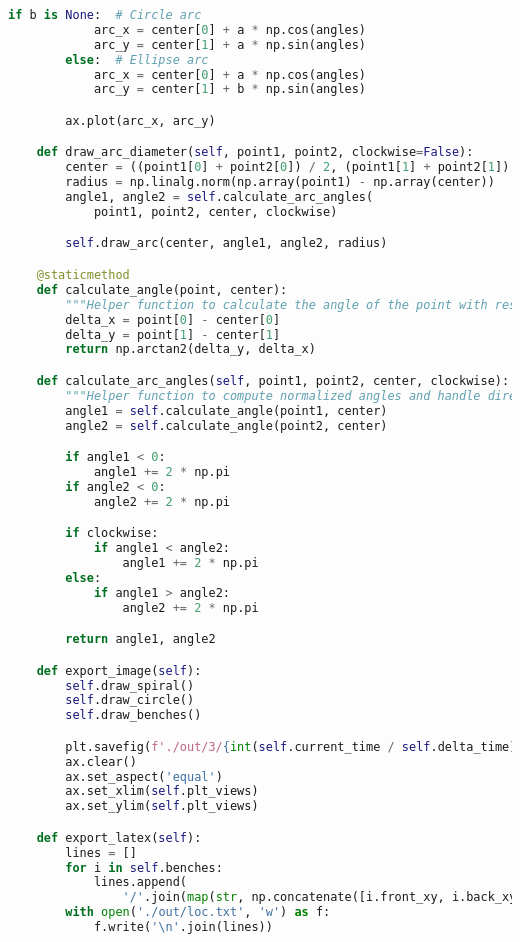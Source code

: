 \begin{lstlisting}[language=python]
        if b is None:  # Circle arc
            arc_x = center[0] + a * np.cos(angles)
            arc_y = center[1] + a * np.sin(angles)
        else:  # Ellipse arc
            arc_x = center[0] + a * np.cos(angles)
            arc_y = center[1] + b * np.sin(angles)

        ax.plot(arc_x, arc_y)

    def draw_arc_diameter(self, point1, point2, clockwise=False):
        center = ((point1[0] + point2[0]) / 2, (point1[1] + point2[1]) / 2)
        radius = np.linalg.norm(np.array(point1) - np.array(center))
        angle1, angle2 = self.calculate_arc_angles(
            point1, point2, center, clockwise)

        self.draw_arc(center, angle1, angle2, radius)

    @staticmethod
    def calculate_angle(point, center):
        """Helper function to calculate the angle of the point with respect to the center"""
        delta_x = point[0] - center[0]
        delta_y = point[1] - center[1]
        return np.arctan2(delta_y, delta_x)

    def calculate_arc_angles(self, point1, point2, center, clockwise):
        """Helper function to compute normalized angles and handle direction"""
        angle1 = self.calculate_angle(point1, center)
        angle2 = self.calculate_angle(point2, center)

        if angle1 < 0:
            angle1 += 2 * np.pi
        if angle2 < 0:
            angle2 += 2 * np.pi

        if clockwise:
            if angle1 < angle2:
                angle1 += 2 * np.pi
        else:
            if angle1 > angle2:
                angle2 += 2 * np.pi

        return angle1, angle2

    def export_image(self):
        self.draw_spiral()
        self.draw_circle()
        self.draw_benches()

        plt.savefig(f'./out/3/{int(self.current_time / self.delta_time)}.png')
        ax.clear()
        ax.set_aspect('equal')
        ax.set_xlim(self.plt_views)
        ax.set_ylim(self.plt_views)

    def export_latex(self):
        lines = []
        for i in self.benches:
            lines.append(
                '/'.join(map(str, np.concatenate([i.front_xy, i.back_xy]).flatten().tolist())) + ',')
        with open('./out/loc.txt', 'w') as f:
            f.write('\n'.join(lines))



\end{lstlisting}
